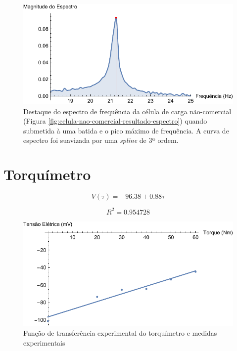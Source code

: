 \documentclass[a4paper]{instrumentacao}
\begin{document}
\begin{figure}[H]
\center
\includegraphics[width=\textwidth]{NaoComercial-SpectrumHighlight.pdf}
\caption{Destaque do espectro de frequência da célula de carga não-comercial (Figura \ref{fig:celula-nao-comercial-resultado-espectro}) quando submetida à uma batida e o pico máximo de frequência. A curva de espectro foi suavizada por uma \textit{spline} de 3ª ordem.}
\label{fig:celula-nao-comercial-resultado-espectro-destaque}
\end{figure}


\section{Torquímetro}

\begin{equation}
	V(\tau) = -96.38 + 0.88 \tau
	\label{eq:torquimetro-tf}
\end{equation}

\begin{equation}
	R^2 = 0.954728
	\label{eq:torquimetro-tf-r2}
\end{equation}

\begin{figure}[H]
\center
\includegraphics[width=\textwidth]{Torquimetro-Plot.pdf}
\caption{Função de transferência experimental do torquímetro e medidas experimentais}
\label{fig:torquimetro-tf}
\end{figure}
\end{document}
